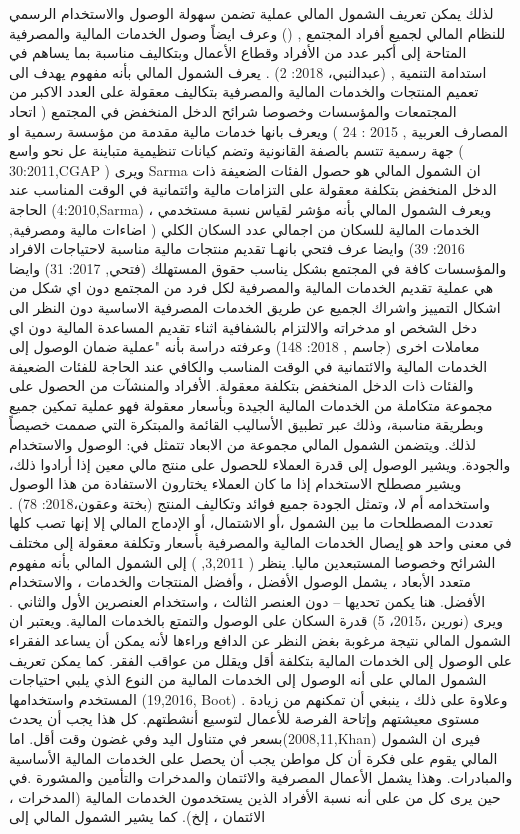\documentclass[10pt,a4paper]{report}
\begin{document}
\begin{doublespacing}
لذلك يمكن تعريف الشمول المالي عملية تضمن سهولة الوصول والاستخدام الرسمي للنظام المالي لجميع أفراد المجتمع , () وعرف ايضاً وصول الخدمات المالية والمصرفية المتاحة إلى أكبر عدد من الأفراد وقطاع الأعمال وبتكاليف مناسبة بما يساهم في استدامة التنمية , (عبدالنبي، 2018: 2) .
يعرف الشمول المالي بأنه مفهوم يهدف الى تعميم المنتجات والخدمات المالية والمصرفية بتكاليف معقولة على العدد الاكبر من المجتمعات والمؤسسات وخصوصا شرائح الدخل المنخفض في المجتمع ( اتحاد المصارف العربية , 2015 : 24 ) ويعرف بانها خدمات مالية مقدمة من مؤسسة رسمية او جهة رسمية تتسم بالصفة القانونية وتضم كيانات تنظيمية متباينة عل نحو واسع ( 30:2011,CGAP ) ویری Sarma ان الشمول المالي هو حصول الفئات الضعيفة ذات الدخل المنخفض بتكلفة معقولة على التزامات مالية وائتمانية في الوقت المناسب عند الحاجة (4:2010,Sarma) ، ويعرف الشمول المالي بأنه مؤشر لقياس نسبة مستخدمي الخدمات المالية للسكان من اجمالي عدد السكان الكلي ( اضاءات مالية ومصرفية, 2016: 39) وايضا عرف فتحي بانهـا تقديم منتجات مالية مناسبة لاحتياجات الافراد والمؤسسات كافة في المجتمع بشكل يناسب حقوق المستهلك (فتحي, 2017: 31) وايضا هي عملية تقديم الخدمات المالية والمصرفية لكل فرد من المجتمع دون اي شكل من اشكال التمييز واشراك الجميع عن طريق الخدمات المصرفية الاساسية دون النظر الى دخل الشخص او مدخراته والالتزام بالشفافية اثناء تقديم المساعدة المالية دون اي معاملات اخرى (جاسم , 2018: 148) وعرفته دراسة  بأنه "عملية ضمان الوصول إلى الخدمات المالية والائتمانية في الوقت المناسب والكافي عند الحاجة للفئات الضعيفة والفئات ذات الدخل المنخفض بتكلفة معقولة. الأفراد والمنشآت من الحصول على مجموعة متكاملة من الخدمات المالية الجيدة وبأسعار معقولة فهو عملية تمكين جميع وبطريقة مناسبة، وذلك عبر تطبيق الأساليب القائمة والمبتكرة التي صممت خصيصاً لذلك. ويتضمن الشمول المالي مجموعة من الابعاد تتمثل في: الوصول والاستخدام والجودة. ويشير الوصول إلى قدرة العملاء للحصول على منتج مالي معين إذا أرادوا ذلك، ويشير مصطلح الاستخدام إذا ما كان العملاء يختارون الاستفادة من هذا الوصول واستخدامه أم لا، وتمثل الجودة جميع فوائد وتكاليف المنتج (بختة وعقون،2018: 78) . تعددت المصطلحات ما بين الشمول ،أو الاشتمال، أو الإدماج المالي إلا إنها تصب كلها في معنى واحد هو إيصال الخدمات المالية والمصرفية بأسعار وتكلفة معقولة إلى مختلف الشرائح وخصوصا المستبعدين ماليا. ينظر ( 3,2011, ) إلى الشمول المالي بأنه مفهوم متعدد الأبعاد ، يشمل الوصول الأفضل ، وأفضل المنتجات والخدمات ، والاستخدام الأفضل. هنا يكمن تحديها – دون العنصر الثالث ، واستخدام العنصرين الأول والثاني . ويرى (نورين ،2015، 5) قدرة السكان على الوصول والتمتع بالخدمات المالية. ويعتبر  ان الشمول المالي نتيجة مرغوبة بغض النظر عن الدافع وراءها لأنه يمكن أن يساعد الفقراء على الوصول إلى الخدمات المالية بتكلفة أقل ويقلل من عواقب الفقر. كما يمكن تعريف الشمول المالي على أنه الوصول إلى الخدمات المالية من النوع الذي يلبي احتياجات المستخدم واستخدامها\textenglish{ (19,2016, Boot)} . وعلاوة على ذلك ، ينبغي أن تمكنهم من زيادة مستوى معيشتهم وإتاحة الفرصة للأعمال لتوسيع أنشطتهم. كل هذا يجب أن يحدث بسعر في متناول اليد وفي غضون وقت أقل. اما(2008,11,Khan) فيرى ان الشمول المالي يقوم على فكرة أن كل مواطن يجب أن يحصل على الخدمات المالية الأساسية والمبادرات. وهذا يشمل الأعمال المصرفية والائتمان والمدخرات والتأمين والمشورة .في حين يرى كل من  على أنه نسبة الأفراد الذين يستخدمون الخدمات المالية (المدخرات ، الائتمان ، إلخ). كما يشير الشمول المالي إلى 
\end{doublespacing}
\end{document}
